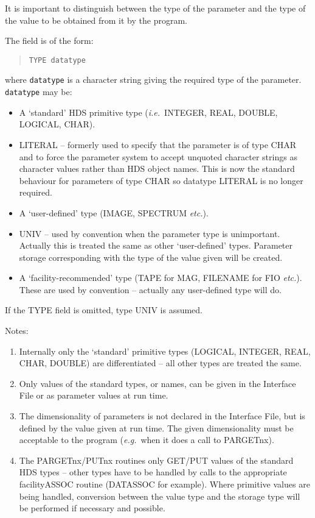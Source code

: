 \documentclass[twoside,11pt]{article}
\renewcommand{\_}{\texttt{\symbol{95}}}
\begin{document}
It is important to distinguish between the type of the parameter and the type 
of the value to be obtained from it by the program.

The field is of the form:
\begin{quote} \begin{verbatim}
TYPE datatype
\end{verbatim} \end{quote}
where \texttt{datatype} is a character string giving the required type of the
parameter.
\texttt{datatype} may be:
\begin{itemize}
\item A `standard' HDS primitive type ({\em i.e.}\ \_INTEGER, \_REAL, \_DOUBLE, \_LOGICAL,
\_CHAR).
\item LITERAL -- formerly used to specify that the parameter is of type \_CHAR
and to force the parameter system to accept unquoted character strings as
character values rather than HDS object names. 
This is now the standard behaviour for parameters of type \_CHAR so datatype
LITERAL is no longer required.
\item A `user-defined' type (IMAGE, SPECTRUM {\em etc.}).
\item UNIV -- used by convention when the parameter type is unimportant. 
Actually this is treated the same as other `user-defined' types.
Parameter storage corresponding with the type of the value given will be
created.
\item A `facility-recommended' type (TAPE for MAG, FILENAME for FIO {\em etc.}).
These are used by convention -- actually any user-defined type will do.
\end{itemize}
If the TYPE field is omitted, type UNIV is assumed.

Notes:
\begin{enumerate}
\item Internally only the `standard' primitive types (\_LOGICAL, \_INTEGER, 
\_REAL, \_CHAR, \_DOUBLE) are differentiated -- all other types are treated
the same.
\item Only values of the standard types, or names, can be given in the 
Interface File or as parameter values at run time.
\item The dimensionality of parameters is not declared in the 
Interface File, but is defined by the value given at run time.
The given dimensionality must be acceptable to the program
({\em e.g.}\ when it does a call to PAR\_GETnx).
\item The PAR\_GETnx/\_PUTnx routines only GET/PUT values of the 
standard HDS types --
other types have to be handled by calls to the appropriate facility\_ASSOC
routine (DAT\_ASSOC for example).
Where primitive values are being handled, conversion between the value type
and the storage type will be performed if necessary and possible.
\end{enumerate}
\end{document}
